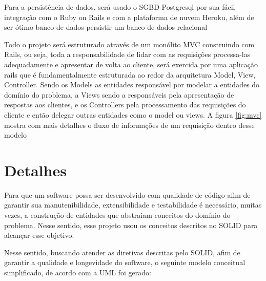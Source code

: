 Para a persistência de dados, será usado o SGBD Postgresql por sua fácil integração com o Ruby on Rails e com a plataforma de nuvem Heroku, além de ser ótimo banco de dados persistir um banco de dados relacional

Todo o projeto será estruturado através de um monólito MVC construindo com Rails, ou seja, toda a responsabilidade de lidar com as requisições processa-las adequadamente e apresentar de volta ao cliente, será  exercida por uma aplicação rails que é fundamentalmente estruturada ao redor da arquitetura Model, View, Controller. Sendo os Models as entidades responsável por modelar a entidades do domínio do problema, a Views sendo a responsáveis pela apresentação de respostas aos clientes, e os Controllers pela processamento das requisições do cliente e então delegar outras entidades como o model ou views. A figura \ref{fig:mvc}  mostra com mais detalhes o fluxo de informações de um requisição dentro desse modelo

\begin{figure}[h!]
  \centering
\end{figure}

\section{Detalhes}

Para que um software possa ser desenvolvido com qualidade de código afim de garantir sua manutenibilidade, extensibilidade e testabilidade é necessário, muitas vezes, a construção de entidades que abstraiam conceitos do domínio do problema. Nesse sentido, esse projeto usou os conceitos descritos no SOLID para alcançar esse objetivo.

Nesse sentido, buscando atender as diretivas descritas pelo SOLID, afim de garantir a qualidade e longevidade do software, o seguinte modelo conceitual simplificado, de acordo com a UML foi gerado:


